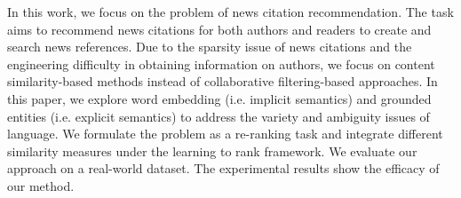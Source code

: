 In this work, we focus on the problem of news citation recommendation. The task aims to recommend news citations for both authors and readers to create and search news references. Due to the sparsity issue of news citations and the engineering difficulty in obtaining information on authors, we focus on content similarity-based methods instead of collaborative filtering-based approaches. In this paper, we explore word embedding (i.e. implicit semantics) and grounded entities (i.e. explicit semantics) to address the variety and ambiguity issues of language. We formulate the problem as a re-ranking task and integrate different similarity measures under the learning to rank framework. We evaluate our approach on a real-world dataset. The experimental results show the efficacy of our method.
